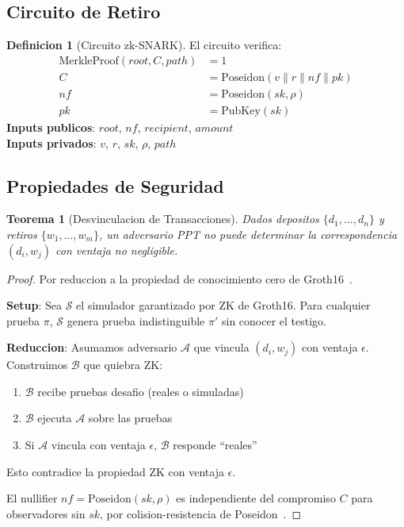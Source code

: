 \documentclass[11pt]{article}
\theoremstyle{definition}
\newtheorem{definicion}{Definicion}[section]
\theoremstyle{plain}
\newtheorem{teorema}{Teorema}[section]
\theoremstyle{remark}
\begin{document}
\subsection{Circuito de Retiro}

\begin{definicion}[Circuito zk-SNARK]
El circuito verifica:
\begin{align}
\text{MerkleProof}(root, C, path) &= 1 \\
C &= \text{Poseidon}(v \| r \| nf \| pk) \\
nf &= \text{Poseidon}(sk, \rho) \\
pk &= \text{PubKey}(sk)
\end{align}
\textbf{Inputs publicos}: $root$, $nf$, $recipient$, $amount$ \\
\textbf{Inputs privados}: $v$, $r$, $sk$, $\rho$, $path$
\end{definicion}

\subsection{Propiedades de Seguridad}

\begin{teorema}[Desvinculacion de Transacciones]
\label{thm:unlinkability}
Dados depositos $\{d_1, ..., d_n\}$ y retiros $\{w_1, ..., w_m\}$, un adversario PPT no puede determinar la correspondencia $(d_i, w_j)$ con ventaja no negligible.
\end{teorema}

\begin{proof}
Por reduccion a la propiedad de conocimiento cero de Groth16~\cite{groth2016size}.

\textbf{Setup}: Sea $\mathcal{S}$ el simulador garantizado por ZK de Groth16. Para cualquier prueba $\pi$, $\mathcal{S}$ genera prueba indistinguible $\pi'$ sin conocer el testigo.

\textbf{Reduccion}: Asumamos adversario $\mathcal{A}$ que vincula $(d_i, w_j)$ con ventaja $\epsilon$. Construimos $\mathcal{B}$ que quiebra ZK:
\begin{enumerate}
    \item $\mathcal{B}$ recibe pruebas desafio (reales o simuladas)
    \item $\mathcal{B}$ ejecuta $\mathcal{A}$ sobre las pruebas
    \item Si $\mathcal{A}$ vincula con ventaja $\epsilon$, $\mathcal{B}$ responde ``reales''
\end{enumerate}

Esto contradice la propiedad ZK con ventaja $\epsilon$.

El nullifier $nf = \text{Poseidon}(sk, \rho)$ es independiente del compromiso $C$ para observadores sin $sk$, por colision-resistencia de Poseidon~\cite{grassi2021poseidon}.
\end{proof}
\end{document}
